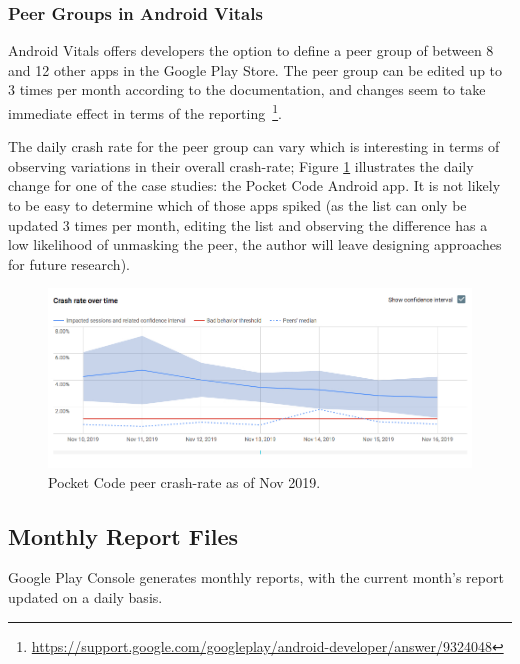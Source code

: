 \subsubsection{Peer Groups in Android Vitals}\label{android-vitals-peer-groups}
Android Vitals offers developers the option to define a peer group of between 8 and 12 other apps in the Google Play Store. The peer group can be edited up to 3 times per month according to the documentation, and changes seem to take immediate effect in terms of the reporting~\footnote{\url{https://support.google.com/googleplay/android-developer/answer/9324048}}.

The daily crash rate for the peer group can vary which is interesting in terms of observing variations in their overall crash-rate; Figure \ref{fig:pocketcode_peer_crash_rate_18_nov_2019} illustrates the daily change for one of the case studies: the Pocket Code Android app. It is not likely to be easy to determine which of those apps spiked (as the list can only be updated 3 times per month, editing the list and observing the difference has a low likelihood of unmasking the peer, the author will leave designing approaches for future research).

\begin{figure}[htbp!]
    \centering
    \includegraphics[width=\textwidth]{images/android-vitals-screenshots/peer-crash-rate-catrobat-18-nov-2019.jpg}
    \caption{Pocket Code peer crash-rate as of  Nov 2019.}
    \label{fig:pocketcode_peer_crash_rate_18_nov_2019}
\end{figure}{}



\subsection{Monthly Report Files}

Google Play Console generates monthly reports, with the current month's report updated on a daily basis. 

